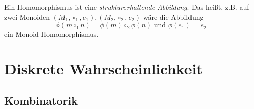 	\bigskip

	Ein Homomorphismus ist eine \emph{strukturerhaltende Abbildung}. 
	Das heißt, z.B. auf zwei Monoiden $(M_1,\circ_1,e_1),(M_2,\circ_2,e_2)$ wäre die Abbildung
	\begin{equation*}
		\phi(m\circ_1 n)=\phi(m)\circ_2 \phi(n)\text{ und }\phi(e_1)=e_2
	\end{equation*}
	ein Monoid-Homomorphismus.


\chapter{Diskrete Wahrscheinlichkeit}
\section{Kombinatorik}







